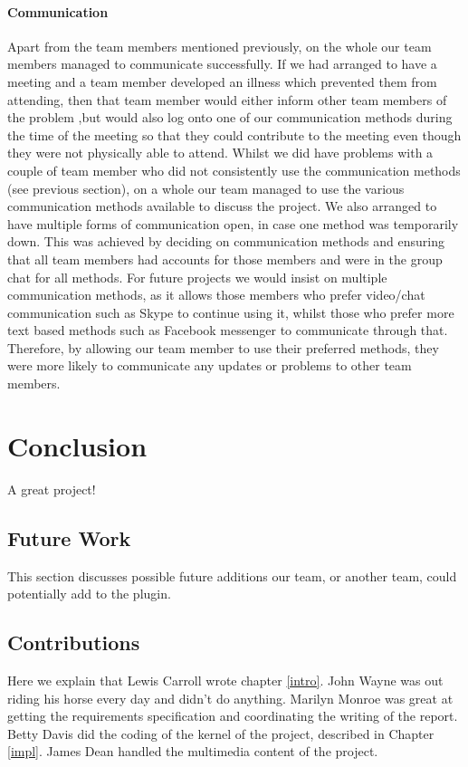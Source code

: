 \documentclass{l3proj}
\begin{document}
\subsubsection{Communication}
Apart from the team members mentioned previously, on the whole our team members managed to communicate successfully. If we had arranged to have a meeting and a team member developed an illness which prevented them from attending, then that team member would either inform other team members of the problem ,but would also log onto one of our communication methods during the time of the meeting so that they could contribute to the meeting even though they were not physically able to attend. Whilst we did have problems with a couple of team member who did not consistently use the communication methods (see previous section), on a whole our team managed to use the various communication methods available to discuss the project. We also arranged to have multiple forms of communication open, in case one method was temporarily down. This was achieved by deciding on communication methods and ensuring that all team members had accounts for those members and were in the group chat for all methods. For future projects we would insist on multiple communication methods, as it allows those members who prefer video/chat communication such as Skype to continue using it, whilst those who prefer more text based methods such as Facebook messenger to communicate through that. Therefore, by allowing our team member to use their preferred methods, they were more likely to communicate any updates or problems to other team members. 

\chapter{Conclusion}

A great project!

\section{Future Work}
This section discusses possible future additions our team, or another team, could potentially add to the plugin. 
\section{Contributions}

Here we explain that Lewis Carroll wrote chapter \ref{intro}. John Wayne
was out riding his horse every day and didn't do anything. Marilyn Monroe
was great at getting the requirements specification and coordinating the
writing of the report. Betty Davis did the coding of the kernel of the
project, described in Chapter \ref{impl}.  James Dean handled the
multimedia content of the project.



\end{document}

